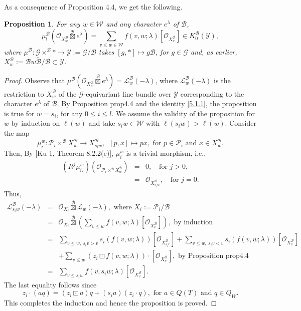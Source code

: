 \documentclass{article}
\newtheorem{proposition}[theorem]{Proposition}
\def\L{\mathcal{L}}
\def\G{\mathcal{G}}
\def\P{\mathcal{P}}
\def\B{\mathcal{B}}
\def\W{\mathcal{W}}
\def\Y{\mathcal{Y}}
\def\ref#1{#1}
\begin{document}
As a consequence of Proposition 4.4, we get the following. 
\begin{proposition}\label{5.2}
For any $w\in \W$ and any character $e^\lambda$ of $\B$, 
$$
\mu_!^\B \left(\mathcal{O}_{X_w^\B} \overset{\B}{\boxtimes} e^\lambda\right) = \sum_{v\leq w\in \W} f\left(v,w; \lambda\right)\left[\mathcal{O}_{X_v^\B}\right] \in K_0^\B \left(\Y\right),
$$
where $\mu^\B: \G\times^\B *\rightarrow \Y:=\G/\B$ takes $[g,*]\mapsto g\B$, for $g\in\G$ and, as earlier, $X_w^\B := \overline{\B w\B/\B}\subset \Y$.
\end{proposition}

\begin{proof}
Observe that $\mu_!^\B\left(\mathcal{O}_{X_w^\B}\overset{\B}{\boxtimes}e^\lambda\right)=\L^\B_w(-\lambda)$, 
where $ \L^\B_w(-\lambda)$ is the restriction to $X_w^\B$ of the $\G$-equivariant 
 line bundle over $\Y$ corresponding to the character $e^\lambda$ of $\B$. 
 By Proposition \ref{prop4.4} and the identity \eqref{5.1.1}, the proposition is true for $w=s_i$, for any $0\leq i \leq l$. We assume the validity of the proposition  for $w$ by induction on $\ell(w)$ and take $s_i w\in\W$ with $\ell(s_i w)>\ell(w)$. 
Consider the map 
$$
\mu_i^w: \P_i\times^\B X_w^\B \to X_{s_i w}^\B, \,\,\,\left[p,x\right] \mapsto px, \mbox{ for } p\in \P_i \mbox{ and } x\in X_w^\B.
$$
Then, By [Ku-1, Theorem 8.2.2(c)], $\mu_i^w$ is a trivial morphism, i.e., 
\begin{eqnarray*}
\left(R^j \mu_{i_*}^w\right) \left( \mathcal{O}_{\P_i\times^\B X^\B_w}\right) &=&0, \quad \mbox{for } j>0, \\
&=& \mathcal{O}_{X^\B_{s_iw}}, \quad \mbox{for } j=0.
\end{eqnarray*}
Thus, 
\begin{eqnarray*}
\L^\B_{s_i w}\left(-\lambda\right)&=&\mathcal{O}_{X_i} \overset{\B}{\boxtimes} \L_w\left(-\lambda\right), \mbox{ where } X_i:=\P_i/\B\\
&=& \mathcal{O}_{X_i} \overset{\B}{\boxtimes} \left(\sum_{v\leq w} f\left(v, w; \lambda\right) \left[ \mathcal{O}_{X_v^\B}\right]\right),\mbox{ by induction}\\
&=& \sum_{v\leq w, ~s_iv>v}s_i \left(f\left(v,w;\lambda\right)\right) \left[ \mathcal{O}_{X_{s_iv}^\B}\right]
+  \sum_{v\leq w, ~s_iv<v}s_i \left(f\left(v,w;\lambda\right)\right) \left[ \mathcal{O}_{X_{v}^\B}\right]\\
&&+  \sum_{v\leq w} \left( z_i \boxdot f\left(v,w;\lambda\right)\right) \cdot \left[ \mathcal{O}_{X_{v}^\B}\right], \mbox{ by Proposition \ref{prop4.4}}\\
&=&\sum_{v\leq s_i w}f\left(v,s_iw;\lambda\right)\left[ \mathcal{O}_{X_{v}^\B}\right].
\end{eqnarray*}
The last equality follows since 
\begin{equation}\label{5.2.1}
z_i\cdot \left(aq\right) = \left(z_i\boxdot a\right) q+ \left(s_ia\right)\left(z_i\cdot q\right), \mbox{ for } a\in Q(T) \mbox{ and } q\in Q_W. 
\end{equation}
This completes the induction and hence the proposition is proved. 
\end{proof}
\end{document}
